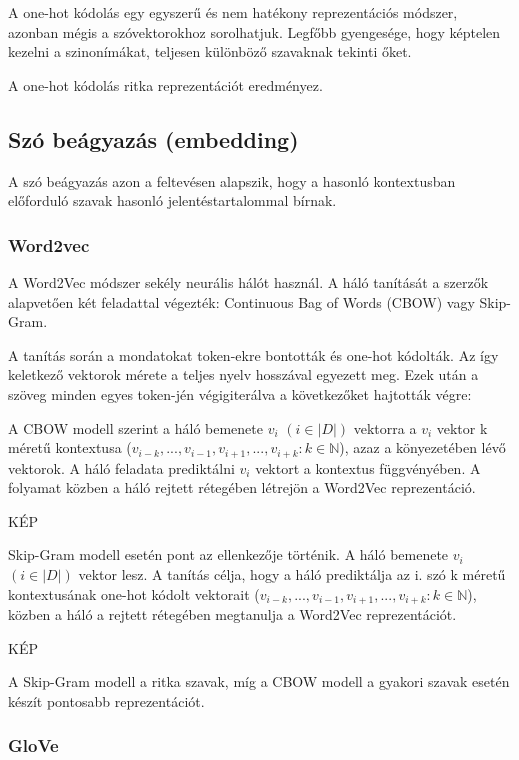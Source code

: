 A one-hot kódolás egy egyszerű és nem hatékony reprezentációs módszer, azonban mégis a szóvektorokhoz sorolhatjuk. Legfőbb gyengesége, hogy képtelen kezelni a szinonímákat, teljesen különböző szavaknak tekinti őket.

\begin{note}
	A one-hot kódolás ritka reprezentációt eredményez.
\end{note}

\subsection{Szó beágyazás (embedding)}

A szó beágyazás azon a feltevésen alapszik, hogy a hasonló kontextusban előforduló szavak hasonló jelentéstartalommal bírnak.

\subsubsection{Word2vec}
A Word2Vec módszer sekély neurális hálót használ. A háló tanítását a szerzők alapvetően két feladattal végezték: Continuous Bag of Words (CBOW) vagy Skip-Gram.

A tanítás során a mondatokat token-ekre bontották és one-hot kódolták. Az így keletkező vektorok mérete a teljes nyelv hosszával egyezett meg. Ezek után a szöveg minden egyes token-jén végigiterálva a következőket hajtották végre:

A CBOW modell szerint a háló bemenete $v_i$
$\left( i \in \left|D\right| \right)$ vektorra a $v_i$ vektor k méretű kontextusa ($v_{i-k},...,v_{i-1}, v_{i+1},..., v_{i+k} : k \in \mathbb{N}$), azaz a könyezetében lévő vektorok. A háló feladata prediktálni $v_i$ vektort a kontextus függvényében. A folyamat közben a háló rejtett rétegében létrejön a Word2Vec reprezentáció.

KÉP

Skip-Gram modell esetén pont az ellenkezője történik. A háló bemenete $v_i$
$\left( i \in \left|D\right| \right)$ vektor lesz. A tanítás célja, hogy a háló prediktálja az i. szó k méretű kontextusának one-hot kódolt vektorait ($v_{i-k},...,v_{i-1}, v_{i+1},..., v_{i+k} : k \in \mathbb{N}$), közben a háló a rejtett rétegében megtanulja a Word2Vec reprezentációt.

KÉP

\begin{note}
	A Skip-Gram modell a ritka szavak, míg a CBOW modell a gyakori szavak esetén készít pontosabb reprezentációt.
\end{note}


\subsubsection{GloVe}
